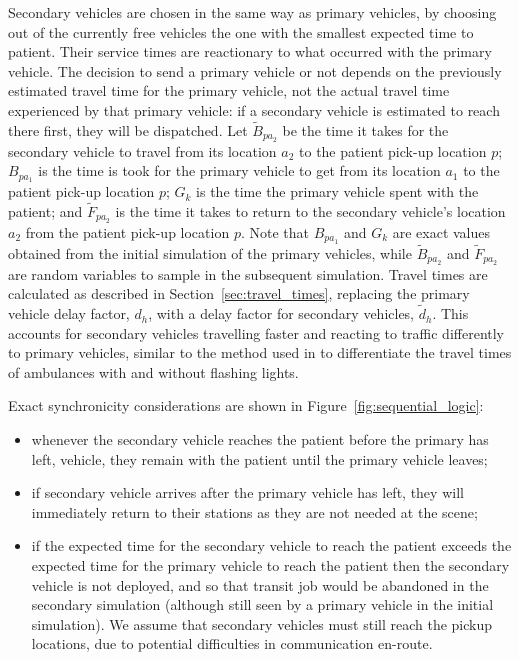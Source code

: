 \documentclass[numbers,webpdf,imaman]{ima-authoring-template}%
\begin{document}
Secondary vehicles are chosen in the same way as primary vehicles, by choosing
out of the currently free vehicles the one with the smallest expected time to
patient. Their service times are reactionary to what occurred with the primary
vehicle. The decision to send a primary vehicle or not depends on the previously
estimated travel time for the primary vehicle, not the actual travel time
experienced by that primary vehicle: if a secondary vehicle is estimated to
reach there first, they will be dispatched.
Let $\tilde{B}_{pa_2}$ be the time it takes for the secondary vehicle to travel
from its location $a_2$ to the patient pick-up location $p$; $B_{pa_1}$ is the
time is took for the primary vehicle to get from its location $a_1$ to the
patient pick-up location $p$; $G_k$ is the time the primary vehicle spent
with the patient; and $\tilde{F}_{pa_2}$ is the time it takes to return to the
secondary vehicle's location $a_2$ from the patient pick-up location $p$.
Note that $B_{pa_1}$ and $G_k$ are exact values obtained from the
initial simulation of the primary vehicles, while $\tilde{B}_{pa_2}$ and
$\tilde{F}_{pa_2}$ are random variables to sample in the subsequent simulation.
Travel times are calculated as described in Section~\ref{sec:travel_times},
replacing the primary vehicle delay factor, $d_h$, with a delay factor for
secondary vehicles, $\tilde{d}_h$. This accounts for secondary vehicles
travelling faster and reacting to traffic differently to primary vehicles,
similar to the method used in \citet{hendersonmason04} to differentiate the
travel times of ambulances with and without flashing lights.

Exact synchronicity considerations are shown in Figure~\ref{fig:sequential_logic}:
\begin{itemize}
  \item whenever the secondary vehicle reaches the patient before the primary
  has left, vehicle, they remain with the patient until the primary vehicle
  leaves;
  \item if secondary vehicle arrives after the primary vehicle has left, they
  will immediately return to their stations as they are not needed at the scene;
  \item if the expected time for the secondary vehicle to reach the patient
  exceeds the expected time for the primary vehicle to reach the patient then
  the secondary vehicle is not deployed, and so that transit job would be
  abandoned in the secondary simulation (although still seen by a primary
  vehicle in the initial simulation). We assume that secondary vehicles must
  still reach the pickup locations, due to potential difficulties in
  communication en-route.
\end{itemize}
\end{document}
